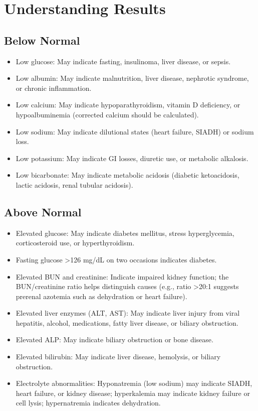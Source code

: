 \section*{Understanding Results}

\subsection*{Below Normal}
\begin{itemize}
  \item Low glucose: May indicate fasting, insulinoma, liver disease, or sepsis.
  \item Low albumin: May indicate malnutrition, liver disease, nephrotic syndrome, or chronic inflammation.
  \item Low calcium: May indicate hypoparathyroidism, vitamin D deficiency, or hypoalbuminemia (corrected calcium should be calculated).
  \item Low sodium: May indicate dilutional states (heart failure, SIADH) or sodium loss.
  \item Low potassium: May indicate GI losses, diuretic use, or metabolic alkalosis.
  \item Low bicarbonate: May indicate metabolic acidosis (diabetic ketoacidosis, lactic acidosis, renal tubular acidosis).
\end{itemize}

\subsection*{Above Normal}
\begin{itemize}
  \item Elevated glucose: May indicate diabetes mellitus, stress hyperglycemia, corticosteroid use, or hyperthyroidism.
  \item Fasting glucose >126 mg/dL on two occasions indicates diabetes.
  \item Elevated BUN and creatinine: Indicate impaired kidney function; the BUN/creatinine ratio helps distinguish causes (e.g., ratio >20:1 suggests prerenal azotemia such as dehydration or heart failure).
  \item Elevated liver enzymes (ALT, AST): May indicate liver injury from viral hepatitis, alcohol, medications, fatty liver disease, or biliary obstruction.
  \item Elevated ALP: May indicate biliary obstruction or bone disease.
  \item Elevated bilirubin: May indicate liver disease, hemolysis, or biliary obstruction.
  \item Electrolyte abnormalities: Hyponatremia (low sodium) may indicate SIADH, heart failure, or kidney disease; hyperkalemia may indicate kidney failure or cell lysis; hypernatremia indicates dehydration.
\end{itemize}

